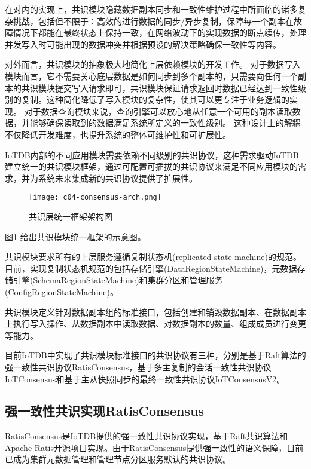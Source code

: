 在对内的实现上，共识模块隐藏数据副本同步和一致性维护过程中所面临的诸多复杂挑战，包括但不限于：高效的进行数据的同步/异步复制，保障每一个副本在故障情况下都能在最终状态上保持一致，在网络波动下的实现数据的断点续传，处理并发写入时可能出现的数据冲突并根据预设的解决策略确保一致性等内容。

对外而言，共识模块的抽象极大地简化上层依赖模块的开发工作。
对于数据写入模块而言，它不需要关心底层数据是如何同步到多个副本的，只需要向任何一个副本的共识模块提交写入请求即可，共识模块保证请求返回时数据已经达到一致性级别的复制。这种简化降低了写入模块的复杂性，使其可以更专注于业务逻辑的实现。
对于数据查询模块来说，查询引擎可以放心地从任意一个可用的副本读取数据，并能够确保读取到的数据满足系统所定义的一致性级别。
这种设计上的解耦不仅降低开发难度，也提升系统的整体可维护性和可扩展性。


IoTDB内部的不同应用模块需要依赖不同级别的共识协议，这种需求驱动IoTDB建立统一的共识模块框架，通过可配置可插拔的共识协议来满足不同应用模块的需求，并为系统未来集成新的共识协议提供了扩展性。

\begin{figure}
    \centering
    \texttt{[image: c04-consensus-arch.png]}
    \caption{共识层统一框架架构图}
    \label{fig:c04-consensus-arch}
  \end{figure}
  
图\ref{fig:c04-consensus-arch} 给出共识模块统一框架的示意图。

共识模块要求所有的上层服务遵循复制状态机(replicated state machine)\cite{lamport1978statemachine}的规范。目前，实现复制状态机规范的包括存储引擎(DataRegionStateMachine)，元数据存储引擎(SchemaRegionStateMachine)和集群分区和管理服务(ConfigRegionStateMachine)。

共识模块定义针对数据副本组的标准接口，包括创建和销毁数据副本、在数据副本上执行写入操作、从数据副本中读取数据、对数据副本的数量、组成成员进行变更等能力。

目前IoTDB中实现了共识模块标准接口的共识协议有三种，分别是基于Raft算法的强一致性共识协议RatisConsensus，基于多主复制的会话一致性共识协议IoTConsensus和基于主从快照同步的最终一致性共识协议IoTConsensusV2。

\subsection{强一致性共识实现RatisConsensus}

RatisConsensus是IoTDB提供的强一致性共识协议实现，基于Raft共识算法和Apache Ratis\cite{ratis}开源项目实现。由于RatisConsensus提供强一致性的语义保障，目前已成为集群元数据管理和管理节点分区服务默认的共识协议。

